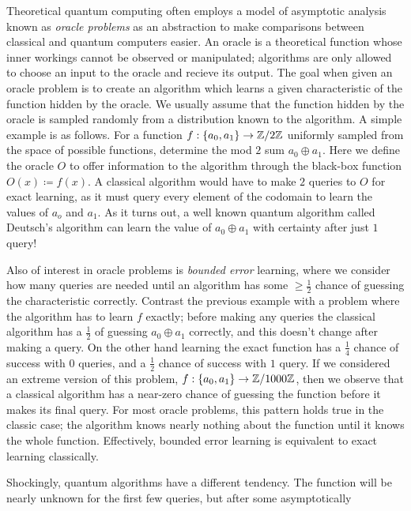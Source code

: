 \documentclass[12pt,twoside]{reedthesis}
\theoremstyle{plain}   %
\theoremstyle{definition}
\theoremstyle{remark}
\numberwithin{equation}{section}
\begin{document}
  Theoretical quantum computing often employs a model
  of asymptotic analysis known as \emph{oracle problems} as an abstraction to make comparisons between classical and quantum computers easier.
  An oracle is a theoretical function whose inner workings cannot be observed or manipulated; algorithms are only allowed to choose an input to the oracle and recieve its output.
  The goal when given an oracle problem is to create an algorithm which learns a given characteristic of the function hidden by the oracle.
  We usually assume that the function hidden by the oracle is sampled randomly from a distribution known to the algorithm.
  A simple example is as follows. For a function $f: \{a_0, a_1 \} \to \mathbb{Z} / 2\mathbb{Z}$ uniformly sampled from the space of possible functions, determine the mod $2$ sum $a_0 \oplus a_1$.
  Here we define the oracle $O$ to offer information to the algorithm through the black-box function $O(x) \coloneq f(x)$.
  A classical algorithm would have to make $2$ queries to $O$ for exact learning, as it must query every element of the codomain to learn the values of $a_o$ and $a_1$.
  As it turns out, a well known quantum algorithm called Deutsch's algorithm can learn the value of $a_0 \oplus a_1$ with certainty after just $1$ query! \par
  Also of interest in oracle problems is \emph{bounded error} learning, where we consider how many queries are needed until an algorithm has some $\geq \frac{1}{2}$ chance of guessing the characteristic correctly.
  Contrast the previous example with a problem where the algorithm has to learn $f$ exactly; before making any queries the classical algorithm has a $\frac{1}{2}$ of guessing $a_0 \oplus a_1$ correctly,
  and this doesn't change after making a query. On the other hand learning the exact function has a $\frac{1}{4}$ chance of success with $0$ queries, and a $\frac{1}{2}$ chance of success with $1$ query.
  If we considered an extreme version of this problem, $f: \{a_0, a_1 \} \to \mathbb{Z} / 1000\mathbb{Z}$, then we observe that a classical algorithm has a near-zero chance of guessing the function before it makes its final query.
  For most oracle problems, this pattern holds true in the classic case; the algorithm knows nearly nothing about the function until it knows the whole function.
  Effectively, bounded error learning is equivalent to exact learning classically. \par
  Shockingly, quantum algorithms have a different tendency.
  The function will be nearly unknown for the first few queries, but after some asymptotically 
\end{document}
